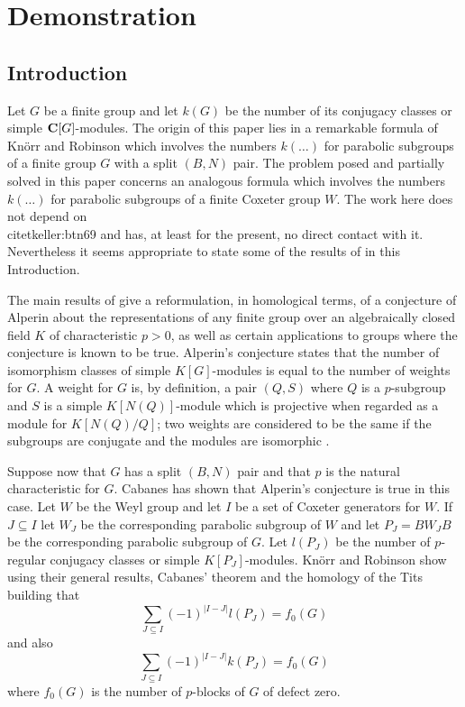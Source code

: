 \chapter{Demonstration}\label{demonstration}   %
\section{Introduction}
\label{1}

\indent Let $G$ be a finite group and let $k(G)$ be the
number of
its conjugacy classes or simple ${\bf C} [G]$-modules.  The
origin of this paper lies in a remarkable formula of
Kn\"orr and Robinson \citet{keller:btn69} which involves the numbers
$k(\ldots)$ for parabolic subgroups of a finite group $G$
with a split $(B,N)$ pair.  The problem posed and partially
solved in this paper concerns an analogous formula which
involves the numbers $k(\ldots)$ for parabolic subgroups of
a finite Coxeter group $W$.  The work here does not depend
on \\citet{keller:btn69} and has, at least for the present, no direct
contact with it.  Nevertheless it seems appropriate to
state some of the results of \citet{keller:btn69} in this
Introduction.

The main results of \citet{keller:btn69} give a reformulation, in
homological terms, of a conjecture of Alperin \citet{arnold:gmt83}
about the representations of any finite group over an
algebraically closed field $K$ of characteristic $p >
0$, as well as certain applications to groups where the
conjecture is known to be true.  Alperin's conjecture
states that the number of isomorphism classes of simple
$K[G]$-modules is equal to the number of weights for $G$.
A weight for $G$ is, by definition, a pair $(Q,S)$ where
$Q$ is a $p$-subgroup and $S$ is a simple $K[N(Q)]$-module
which is projective when regarded as a module for
$K[N(Q)/Q]$; two weights are considered to be the same if
the subgroups are conjugate and the modules are isomorphic \citep{amann:gd83}.

Suppose now that $G$ has a split $(B,N)$ pair and that $p$
is the natural characteristic for $G$.  Cabanes \citet{collett:imi80}
has shown that Alperin's conjecture is true in this case.
Let $W$ be the Weyl group and let $I$ be a set of Coxeter
generators for $W$.  If $J \subseteq I$ let $W_{J}$ be the
corresponding parabolic subgroup of $W$ and let $P_{J} =
BW_{J}B$ be the corresponding parabolic subgroup of $G$.
Let $l(P_{J})$ be the number of $p$-regular conjugacy
classes or simple $K[P_{J}]$-modules.  Kn\"orr and
Robinson show using their general results, Cabanes' theorem
and the homology of the Tits building that
\begin{equation}
 \sum_{J \subseteq I} (-1)^{|I-J|} l(P_{J}) = f_{0}(G)
\label{101}
\end{equation}
and also
\begin{equation}
 \sum_{J \subseteq I} (-1)^{|I-J|} k(P_{J}) = f_{0}(G)
\label{102}
\end{equation}
where $f_{0}(G)$ is the number of $p$-blocks of $G$ of
defect zero.
